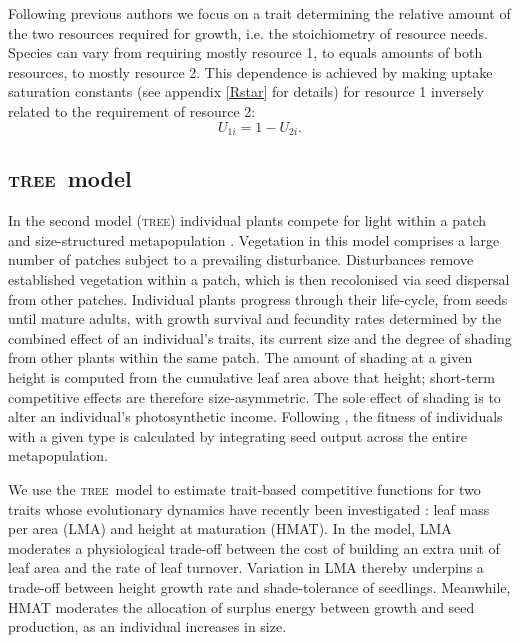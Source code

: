 \documentclass[a4paper,11pt]{article}
\newcommand{\TREE}{\textsc{tree}}
\begin{document}
Following previous authors \citep{Tilman-1985, Schreiber-2003, Fox-2008} we
focus on a trait determining the relative amount of the two resources
required for growth, i.e. the stoichiometry of resource needs. Species can
vary from requiring mostly resource 1, to equals amounts of both resources, to
mostly resource 2. This dependence is achieved by making uptake saturation
constants (see appendix  \ref{Rstar} for details) for resource 1 inversely related
to the requirement of resource 2:
\begin{equation}
\label{eq:R3}
U_{1i} = 1-U_{2i}.
\end{equation}

\subsection{\TREE\ model}

In the second model (\TREE) individual plants compete for light within a patch
and size-structured metapopulation \citep{Falster-2011, Falster-2015}.
Vegetation in this model comprises a large number of patches subject to a
prevailing disturbance. Disturbances remove established vegetation within a
patch, which is then recolonised via seed dispersal from other patches.
Individual plants progress through their life-cycle, from seeds until mature
adults, with growth survival and fecundity rates determined by the combined
effect of an individual's traits, its current size and the degree of shading
from other plants within the same patch. The amount of shading at a given
height is computed from the cumulative leaf area above that height; short-term
competitive effects are therefore size-asymmetric. The sole effect of shading
is to alter an individual's photosynthetic income. Following
\citep{Falster-2015}, the fitness of individuals with a given type is
calculated by integrating seed output across the entire metapopulation.

We use the \TREE\ model to estimate trait-based competitive functions for
two traits whose evolutionary dynamics have recently been investigated
\citep{Falster-2015}: leaf mass per area (LMA) and height at maturation
(HMAT). In the model, LMA moderates a physiological trade-off between the cost
of building an extra unit of leaf area and the rate of leaf turnover.
Variation in LMA thereby underpins a trade-off between height growth rate and
shade-tolerance of seedlings. Meanwhile, HMAT moderates the allocation of
surplus energy between growth and seed production, as an individual increases in
size.
\end{document}
